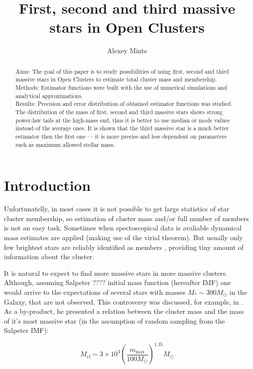 \documentclass{aastex}
\title{First, second and third massive stars in Open Clusters}
\author{Alexey Mints}
\affil{University of Bielefeld, Germany}
\newcommand{\MSun}{M_\odot}
\newcommand{\Mmax}{m_{\mathrm{max}}}
\newcommand{\Mcl}{M_{\mathrm{cl}}}
\begin{document}
\maketitle

\begin{abstract}
 Aims: The goal of this paper is to study possibilities of using first, second and third massive stars 
 in Open Clusters to estimate total cluster mass and membership. \\
 Methods: Estimator functions were built with the use of
 numerical simulations and analytical approximations. \\
 Results: Precision and error distribution of obtained estimator functions was studied.
 The distribution of the mass of first, second and third massive stars shows strong power-law
 tails at the high-mass end, thus it is better to use median or mode values instead of the average ones.
 It is shown that the third massive star is a much better estimator then the first one --- it is more precise and less dependent on
 parameters such as maximum allowed stellar mass.
\end{abstract}

\section{Introduction}
Unfortunatelly, in most cases it is not possible to get large statistics of star cluster membership,
so estimation of cluster mass and/or full number of members is not an easy task. Sometimes when spectoscopical data is avaliable dynamical mass estimates are applied (making use of the virial theorem). But usually only few brightest
stars are reliably identified as members \citep{Kharchenko2003}, providing tiny amount of information about the cluster.

It is natural to expect to find more massive stars in more massive clusters. Although, assuming Salpeter ???? initial mass function (hereafter IMF) one would arrive to the expectations of several stars with masses $M_{*} \sim 300 \MSun$ in the Galaxy, that are not observed. This controversy was discussed, for example, in \citet{Elmegreen}. As a by-product, he presented a relation between the
cluster mass and the mass of it's most massive star (in the assumption of random sampling from the Salpeter IMF):

\begin{equation}
  \Mcl \sim 3 \times 10^3 \left( \frac{\Mmax}{100 \MSun} \right) ^{1.35} \MSun
\end{equation}
\end{document}
